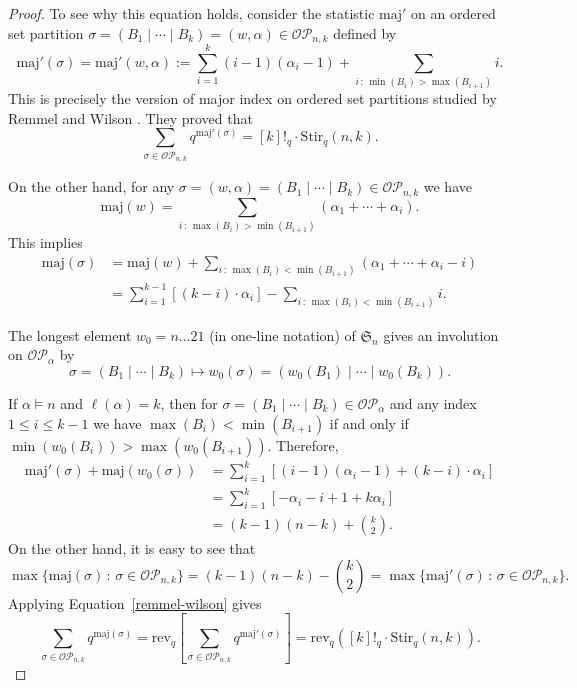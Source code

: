 \documentclass[10pt]{amsart}
\theoremstyle{definition}
\newcommand{\maj}{{\mathrm {maj}}}
\newcommand{\Stir}{{\mathrm {Stir}}}
\newcommand{\rev}{{\mathrm {rev}}}
\newcommand{\symm}{{\mathfrak{S}}}
\newcommand{\OP}{{\mathcal{OP}}}
\begin{document}
\begin{proof}
To see why this equation holds, consider the statistic $\maj'$ on an ordered set partition 
$\sigma = (B_1 \mid \cdots \mid B_k) = (w, \alpha) \in \OP_{n,k}$ defined by
\begin{equation}
\maj'(\sigma) = \maj'(w,\alpha) := \sum_{i = 1}^k (i-1)(\alpha_i - 1) + \sum_{i \, : \, \min(B_i) > \max(B_{i+1})} i.
\end{equation}
This is precisely the version of major index on ordered set partitions studied
by Remmel and Wilson \cite{RW}.  They proved \cite[Eqn. 15, Prop. 5.1.1]{RW}
that
\begin{equation}
\label{remmel-wilson}
\sum_{\sigma \in \OP_{n,k}} q^{\maj'(\sigma)} = [k]!_q \cdot \Stir_q(n,k).
\end{equation}

On the other hand, for any $\sigma = (w,\alpha) = (B_1 \mid \cdots \mid B_k) \in \OP_{n,k}$ we have
\begin{equation}
\maj(w) = \sum_{i \, : \, \max(B_i) > \min(B_{i+1})} (\alpha_1 + \cdots + \alpha_i).
\end{equation}
This implies
\begin{align}
\maj(\sigma) &= \maj(w) + \sum_{i \, : \, \max(B_i) < \min(B_{i+1})} (\alpha_1 + \cdots + \alpha_i - i) \\
&= \sum_{i = 1}^{k-1} [(k-i) \cdot \alpha_i]   - \sum_{i \, : \, \max(B_i) < \min(B_{i+1})} i.
\end{align}

The longest element $w_0 =  n \dots 21$ (in one-line notation) of $\symm_n$ gives an involution on $\OP_\alpha$ by
\begin{equation*}
\sigma = (B_1 \mid \cdots \mid B_k) \mapsto w_0(\sigma) = (w_0(B_1) \mid \cdots \mid w_0(B_k)).
\end{equation*}



If $\alpha \models n$ and $\ell(\alpha) = k$, then for $\sigma = (B_1 \mid \cdots \mid B_k) \in \OP_{\alpha}$
and any index $1 \leq i \leq k-1$ 
we have $\max(B_i) < \min(B_{i+1})$ if and only if $\min(w_0(B_i)) > \max(w_0(B_{i+1}))$.
Therefore,
\begin{align}
\maj'(\sigma) + \maj(w_0(\sigma)) &=  \sum_{i = 1}^{k} [(i-1)(\alpha_i - 1) + (k-i) \cdot \alpha_i] \\
&=  \sum_{i = 1}^{k} [-\alpha_i - i + 1 + k \alpha_i] \\
&= (k-1)(n - k) + {k \choose 2}.
\end{align}
On the other hand, it is easy to see that 
\begin{equation*}
\max\{ \maj(\sigma) \,:\, \sigma \in \OP_{n,k} \} = (k-1)(n - k) - {k \choose 2} =
\max\{ \maj'(\sigma) \,:\, \sigma \in \OP_{n,k} \}.
\end{equation*}
Applying Equation~\eqref{remmel-wilson} gives
\begin{equation}
\sum_{\sigma \in \OP_{n,k}} q^{\maj(\sigma)} = \rev_q \left[ \sum_{\sigma \in \OP_{n,k}} q^{\maj'(\sigma)} \right]
= \rev_q( [k]!_q \cdot \Stir_q(n,k) ).
\end{equation}
\end{proof}
\end{document}
